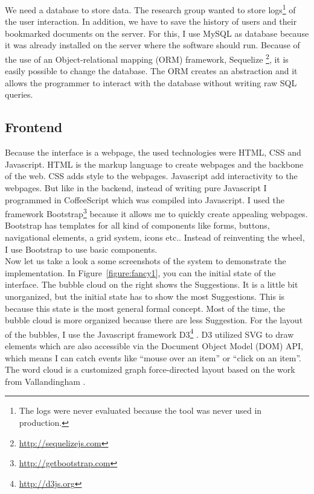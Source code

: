 \documentclass[11pt]{report}
\begin{document}
We need a database to store data. The research group wanted to store logs\footnote{The logs were never evaluated because the tool was never used in production.} of the user interaction. In addition, we have to save the history of users and their bookmarked documents on the server. For this, I use MySQL as database because it was already installed on the server where the software should run. Because of the use of an Object-relational mapping (ORM) framework, Sequelize \footnote{\url{http://sequelizejs.com}}, it is easily possible to change the database. The ORM creates an abstraction and it allows the programmer to interact with the database without writing raw SQL queries.

\subsection{Frontend}

Because the interface is a webpage, the used technologies were HTML, CSS and Javascript. HTML is the markup language to create webpages and the backbone of the web. CSS adds style to the webpages. Javascript add interactivity to the webpages. But like in the backend, instead of writing pure Javascript I programmed in CoffeeScript which was compiled into Javascript. I used the framework Bootstrap\footnote{\url{http://getbootstrap.com}} because it allows me to quickly create appealing webpages. Bootstrap has templates for all kind of components like forms, buttons, navigational elements, a grid system, icons etc.. Instead of reinventing the wheel, I use Bootstrap to use basic components.\\

Now let us take a look a some screenshots of the system to demonstrate the implementation. In Figure~\ref{figure:fancy1}, you can the initial state of the interface. The bubble cloud on the right shows the Suggestions. It is a little bit unorganized, but the initial state has to show the most Suggestions. This is because this state is the most general formal concept. Most of the time, the bubble cloud is more organized because there are less Suggestion. For the layout of the bubbles, I use the Javascript framework D3\footnote{\url{http://d3js.org}} \cite{Bostock2011}. D3 utilized SVG to draw elements which are also accessible via the Document Object Model (DOM) API, which means I can catch events like ``mouse over an item'' or ``click on an item''. The word cloud is a customized graph force-directed layout based on the work from Vallandingham \cite{Vallandingham}. \\
\end{document}
